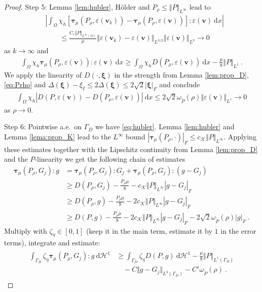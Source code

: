 \documentclass{article}
\theoremstyle{definition}
\newcommand{\bfv}{\boldsymbol{v}}
\newcommand{\bftau}{\boldsymbol{\tau}}
\newcommand{\bfxi}{\boldsymbol{\xi}}
\newcommand{\K}{\mathcal{K}}
\newcommand{\dd}{\:\mathrm{d}}
\begin{document}
\begin{proof}
Step 5:
    Lemma \ref{lem:hubler}, H\"older and $P_\rho \leq \Vert P\Vert_{L^\infty}$ lead to
    \begin{align*}
        &\left|\int_\Omega \chi_h[\bftau_\mu(P_\rho, \varepsilon(\bfv_k)) - \bftau_\mu(P_\rho,\varepsilon(\bfv))]:\varepsilon(\bfv)\dd x\right|\\
        &\qquad\leq \frac{C_e \Vert P\Vert_{L^\infty(\Omega)}}{\mu} \Vert \varepsilon(\bfv_k)-\varepsilon(\bfv)\Vert_{L^{3/2}}
        \Vert \varepsilon(\bfv)\Vert_{L^3} \rightarrow 0
    \end{align*}
    as $k\rightarrow \infty$ and
    \begin{align*}
        \int_\Omega \chi_h\bftau_\mu (P_\rho, \varepsilon(\bfv)):\varepsilon(\bfv)\dd x \geq
        \int_\Omega \chi_h D(P_\rho, \varepsilon(\bfv))\dd x - \frac{\mu}{8} \Vert P \Vert_{L^1} \ .
    \end{align*}
    We apply the linearity of $D(\cdot,\bfxi)$ in the strength from Lemma \ref{lem:prop_D}, \eqref{eq:Prho} and
    $\Delta (\bfxi) - \xi_I \leq 2\Delta(\bfxi) \leq 2 \sqrt{2}|\bfxi|_F$ and conclude
    \begin{align*}
        \int_\Omega \chi_h|D(P,\varepsilon(\bfv))-D(P_\rho, \varepsilon(\bfv))|\dd x
        \leq 2 \sqrt{2}\omega_{\widetilde P}(\rho) \Vert\varepsilon(\bfv)\Vert_{L^{1}} \rightarrow 0
    \end{align*}
    as $\rho \rightarrow 0$.

Step 6:
    Pointwise a.e.\ on $\Gamma_D$ we have \eqref{eq:hubler}.  Lemma \ref{lem:hubler}
    and Lemma \ref{lema:prop_K}  lead to the $L^{\infty}$ bound
    $|\bftau_\mu (P_\rho, \cdot)|_F \leq c_\K \Vert P \Vert_{L^\infty} $. Applying these
    estimates together with the Lipschitz continuity from Lemma \ref{lem:prop_D} and the $P$-linearity
    we get the following chain of estimates
    \begin{align*}
        \bftau_\mu(P_\rho, G_j) :g &=  \bftau_\mu(P_\rho, G_j) : G_j + \bftau_\mu (P_\rho, G_j) :(g-G_j) \\
        &\geq D(P_\rho, G_j) - \frac{P_\rho\mu}{8} - c_\K \Vert P \Vert_{L^\infty} |g-G_j|_F \\
        &\geq D(P_\rho, g) - \frac{P_\rho\mu}{8} - 2c_\K \Vert P \Vert_{L^\infty} |g-G_j|_F \\
        &\geq D(P, g) - \frac{P_\rho\mu}{8} - 2c_\K \Vert P \Vert_{L^\infty} |g-G_j|_F - 2 \sqrt{2} \omega_{\widetilde P}(\rho)|g|_F \ .
    \end{align*}
    Multiply with $\zeta_\eta \in [0,1]$ (keep it in the main term, estimate it by $1$ in the error terms), integrate
    and estimate:
    \begin{align}
        \begin{split}
        \int_{\Gamma_D} \zeta_\eta \bftau_\mu (P_\rho, G_j) : g \dd \mathcal{H}^{1}
        &\geq \int_{\Gamma_D} \zeta_\eta D(P, g) \dd \mathcal{H}^{1}
        -\frac{\mu}{8} \Vert P \Vert_{L^{1}(\Gamma_D)}\\
        &\quad - C \Vert g-G_j\Vert_{L^{3}(\Gamma_D)} - C' \omega_{\widetilde P}(\rho) \ .
        \end{split}
    \end{align}


\end{proof}
\end{document}
